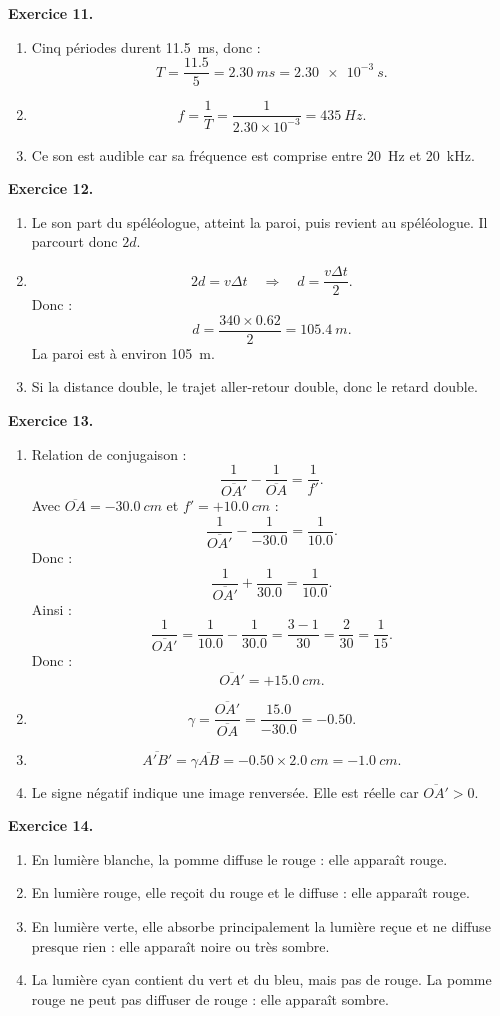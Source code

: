 \documentclass[11pt,a4paper]{article}
\newcommand{\corr}[2]{
  \begin{correctionbox}
  \textbf{Exercice #1.} #2
  \end{correctionbox}
}
\begin{document}
\corr{11}{
\begin{enumerate}
  \item Cinq périodes durent \SI{11.5}{ms}, donc :
  \[
  T=\frac{11.5}{5}=\SI{2.30}{ms}=\SI{2.30e-3}{s}.
  \]
  \item
  \[
  f=\frac{1}{T}=\frac{1}{2.30\times 10^{-3}}=\SI{435}{Hz}.
  \]
  \item Ce son est audible car sa fréquence est comprise entre \SI{20}{Hz} et \SI{20}{kHz}.
\end{enumerate}
}

\corr{12}{
\begin{enumerate}
  \item Le son part du spéléologue, atteint la paroi, puis revient au spéléologue. Il parcourt donc $2d$.
  \item
  \[
  2d=v\Delta t
  \quad \Rightarrow \quad
  d=\frac{v\Delta t}{2}.
  \]
  Donc :
  \[
  d=\frac{340\times 0.62}{2}=\SI{105.4}{m}.
  \]
  La paroi est à environ \SI{105}{m}.
  \item Si la distance double, le trajet aller-retour double, donc le retard double.
\end{enumerate}
}

\corr{13}{
\begin{enumerate}
  \item Relation de conjugaison :
  \[
  \frac{1}{\overline{OA'}}-\frac{1}{\overline{OA}}=\frac{1}{f'}.
  \]
  Avec $\overline{OA}=-\SI{30.0}{cm}$ et $f'=+\SI{10.0}{cm}$ :
  \[
  \frac{1}{\overline{OA'}}-\frac{1}{-30.0}=\frac{1}{10.0}.
  \]
  Donc :
  \[
  \frac{1}{\overline{OA'}}+\frac{1}{30.0}=\frac{1}{10.0}.
  \]
  Ainsi :
  \[
  \frac{1}{\overline{OA'}}=\frac{1}{10.0}-\frac{1}{30.0}
  =\frac{3-1}{30}=\frac{2}{30}=\frac{1}{15}.
  \]
  Donc :
  \[
  \overline{OA'}=+\SI{15.0}{cm}.
  \]
  \item
  \[
  \gamma=\frac{\overline{OA'}}{\overline{OA}}=\frac{15.0}{-30.0}=-0.50.
  \]
  \item
  \[
  \overline{A'B'}=\gamma \overline{AB}=-0.50\times \SI{2.0}{cm}=-\SI{1.0}{cm}.
  \]
  \item Le signe négatif indique une image renversée. Elle est réelle car $\overline{OA'}>0$.
\end{enumerate}
}

\corr{14}{
\begin{enumerate}
  \item En lumière blanche, la pomme diffuse le rouge : elle apparaît rouge.
  \item En lumière rouge, elle reçoit du rouge et le diffuse : elle apparaît rouge.
  \item En lumière verte, elle absorbe principalement la lumière reçue et ne diffuse presque rien : elle apparaît noire ou très sombre.
  \item La lumière cyan contient du vert et du bleu, mais pas de rouge. La pomme rouge ne peut pas diffuser de rouge : elle apparaît sombre.
\end{enumerate}
}
\end{document}

